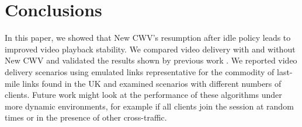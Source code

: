 \documentclass[10pt,sigconf,anonymous]{acmart}
\begin{document}
%
% 



\section{Conclusions}
\label{sec:conclusion}

In this paper, we showed that New CWV's resumption after idle policy leads to improved video playback stability. We compared video delivery with and without New CWV and validated the results shown by previous work \cite{Nazir-2014-performance-evaluation-congestion-window-validation-dash-newcwv}. We reported video delivery scenarios using emulated links representative for the commodity of last-mile links found in the UK and examined scenarios with different numbers of clients. Future work might look at the performance of these algorithms under more dynamic environments, for example if all clients join the session at random times or in the presence of other cross-traffic. 





%
\end{document}
